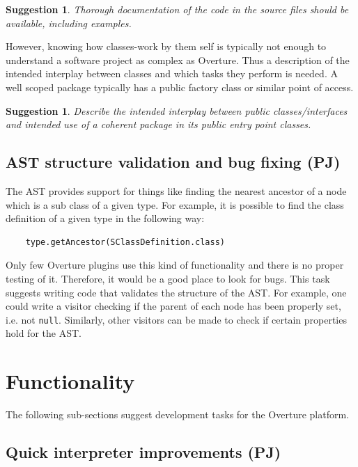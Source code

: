 \documentclass[11pt]{overturerep} \usepackage{t1enc,times,a4,t1enc}
\newtheorem{sug}[subsection]{Suggestion}
\begin{document}
\begin{sug} Thorough documentation of the code in the source files
    should be available, including examples. 
\end{sug}

However, knowing how classes-work by them self is typically not enough
to understand a software project as complex as Overture.  Thus a
description of the intended interplay between classes and which tasks
they perform is needed.  A well scoped package typically has a public
factory class or similar point of access.

\begin{sug} 
    Describe the intended interplay between \emph{public}
    classes/interfaces and intended use of a coherent package in its
    public entry point classes. 
\end{sug}

\section{AST structure validation and bug fixing (PJ)}

The AST provides support for things like finding the nearest
ancestor of a node which is a sub class of a given type. For
example, it is possible to find the class definition of a given
type in the following way:

\begin{lstlisting} 
    type.getAncestor(SClassDefinition.class) 
\end{lstlisting}

Only few Overture plugins use this kind of functionality and there
is no proper testing of it. Therefore, it would be a good place to
look for bugs. This task suggests writing code that validates the
structure of the AST. For example, one could write a visitor
checking if the parent of each node has been properly set, i.e. not
\texttt{null}. Similarly, other visitors can be made to check if
certain properties hold for the AST.







\chapter{Functionality}

The following sub-sections suggest development tasks for the
Overture platform.

\section{Quick interpreter improvements (PJ)}
\end{document}
